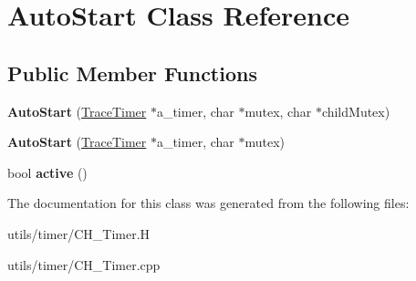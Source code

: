 \hypertarget{class_auto_start}{}\section{Auto\+Start Class Reference}
\label{class_auto_start}
\subsection*{Public Member Functions}
\begin{DoxyCompactItemize}
\item 
\mbox{\label{class_auto_start_a9e0816a258371fe0ec3ea3c14267ef5c}} 
{\bfseries Auto\+Start} (\hyperlink{class_trace_timer}{Trace\+Timer} $\ast$a\+\_\+timer, char $\ast$mutex, char $\ast$child\+Mutex)
\item 
\mbox{\label{class_auto_start_aa3bd9f51f4f29c99c2147903cc6db7d2}} 
{\bfseries Auto\+Start} (\hyperlink{class_trace_timer}{Trace\+Timer} $\ast$a\+\_\+timer, char $\ast$mutex)
\item 
\mbox{\label{class_auto_start_a391135bddc96b9bda90d46711329fb29}} 
bool {\bfseries active} ()
\end{DoxyCompactItemize}


The documentation for this class was generated from the following files\+:\begin{DoxyCompactItemize}
\item 
utils/timer/C\+H\+\_\+\+Timer.\+H\item 
utils/timer/C\+H\+\_\+\+Timer.\+cpp\end{DoxyCompactItemize}
